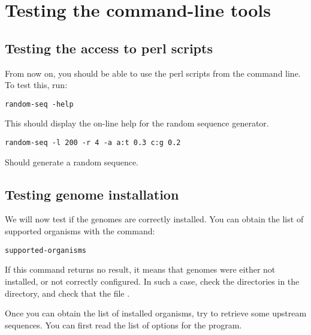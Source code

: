 \documentclass{book}
\begin{document}





\chapter{Testing the command-line tools}

\section{Testing the access to perl scripts}

From now on, you should be able to use the perl scripts from the
command line. To test this, run:

\begin{verbatim}
random-seq -help
\end{verbatim}

This should display the on-line help for the random sequence
generator.

\begin{verbatim}
random-seq -l 200 -r 4 -a a:t 0.3 c:g 0.2
\end{verbatim}

Should generate a random sequence.

\section{Testing genome installation}

We will now test if the genomes are correctly installed. You can
obtain the list of supported organisms with the command:

\begin{verbatim}
supported-organisms
\end{verbatim}

If this command returns no result, it means that genomes were either
not installed, or not correctly configured. In such a case, check the
directories in the  directory, and check that the
file .

Once you can obtain the list of installed organisms, try to retrieve
some upstream sequences. You can first read the list of options for the
 program.
\end{document}
